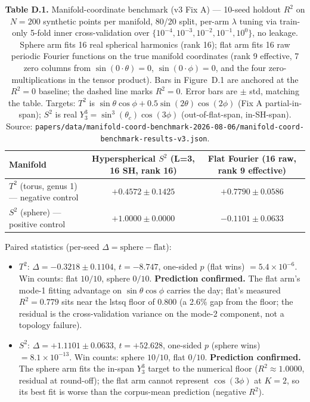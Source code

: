 \documentclass[11pt,a4paper]{article}
\theoremstyle{plain}
\theoremstyle{remark}
\theoremstyle{plain}
\begin{document}
\begin{table}[h]
\centering
\begin{tabular}{lcc}
\toprule
Manifold & Hyperspherical $S^2$ (L=3, 16 SH, rank 16) & Flat Fourier (16 raw, rank 9 effective) \\
\midrule
$T^2$ (torus, genus 1) --- negative control & $+0.4572 \pm 0.1425$ & $+0.7790 \pm 0.0586$ \\
$S^2$ (sphere) --- positive control            & $+1.0000 \pm 0.0000$ & $-0.1101 \pm 0.0633$ \\
\bottomrule
\end{tabular}
\caption{\textbf{Table D.1.} Manifold-coordinate benchmark (v3 Fix A) --- 10-seed holdout $R^2$ on $N = 200$ synthetic points per manifold, 80/20 split, per-arm $\lambda$ tuning via train-only 5-fold inner cross-validation over $\{10^{-4}, 10^{-3}, 10^{-2}, 10^{-1}, 10^{0}\}$, no leakage. Sphere arm fits 16 real spherical harmonics (rank 16); flat arm fits 16 raw periodic Fourier functions on the true manifold coordinates (rank 9 effective, 7 zero columns from $\sin(0\!\cdot\!\theta)=0$, $\sin(0\!\cdot\!\phi)=0$, and the four zero-multiplications in the tensor product). Bars in Figure~D.1 are anchored at the $R^2 = 0$ baseline; the dashed line marks $R^2 = 0$. Error bars are $\pm$ std, matching the table. Targets: $T^2$ is $\sin\theta\cos\phi + 0.5\sin(2\theta)\cos(2\phi)$ (Fix A partial-in-span); $S^2$ is real $Y_3^3 = \sin^3(\theta_c)\cos(3\phi)$ (out-of-flat-span, in-SH-span). Source: \texttt{papers/data/manifold-coord-benchmark-2026-08-06/manifold-coord-benchmark-results-v3.json}.}
\label{tab:manifold-coord}
\end{table}

Paired statistics (per-seed $\Delta = \mathrm{sphere} - \mathrm{flat}$):
\begin{itemize}
\item $T^2$: $\Delta = -0.3218 \pm 0.1104$, $t = -8.747$, one-sided $p$ (flat wins) $= 5.4 \times 10^{-6}$. Win counts: flat $10/10$, sphere $0/10$. \textbf{Prediction confirmed.} The flat arm's mode-1 fitting advantage on $\sin\theta\cos\phi$ carries the day; flat's measured $R^2 = 0.779$ sits near the lstsq floor of $0.800$ (a 2.6\% gap from the floor; the residual is the cross-validation variance on the mode-2 component, not a topology failure).
\item $S^2$: $\Delta = +1.1101 \pm 0.0633$, $t = +52.628$, one-sided $p$ (sphere wins) $= 8.1 \times 10^{-13}$. Win counts: sphere $10/10$, flat $0/10$. \textbf{Prediction confirmed.} The sphere arm fits the in-span $Y_3^3$ target to the numerical floor ($R^2 \approx 1.0000$, residual at round-off); the flat arm cannot represent $\cos(3\phi)$ at $K{=}2$, so its best fit is worse than the corpus-mean prediction (negative $R^2$).
\end{itemize}
\end{document}
